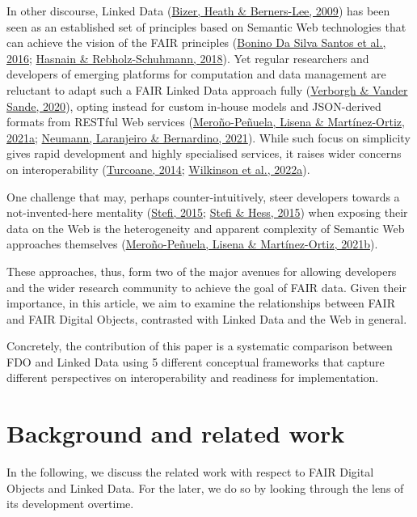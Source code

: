 In other discourse, Linked Data (\protect\hyperlink{ref-19s3yyxDn}{Bizer, Heath \& Berners-Lee, 2009}) has been seen as an established set of principles based on Semantic Web technologies that can achieve the vision of the FAIR principles (\protect\hyperlink{ref-EJDjHrUv}{Bonino Da Silva Santos et al., 2016}; \protect\hyperlink{ref-GJHYN6xW}{Hasnain \& Rebholz-Schuhmann, 2018}). Yet regular researchers and developers of emerging platforms for computation and data management are reluctant to adapt such a FAIR Linked Data approach fully (\protect\hyperlink{ref-jHwttlTs}{Verborgh \& Vander Sande, 2020}), opting instead for custom in-house models and JSON-derived formats from RESTful Web services (\protect\hyperlink{ref-99MS5xE0}{Meroño-Peñuela, Lisena \& Martínez-Ortiz, 2021a}; \protect\hyperlink{ref-J2H8yssV}{Neumann, Laranjeiro \& Bernardino, 2021}). While such focus on simplicity gives rapid development and highly specialised services, it raises wider concerns on interoperability (\protect\hyperlink{ref-DNTCUjpC}{Turcoane, 2014}; \protect\hyperlink{ref-Pa67pUtR}{Wilkinson et al., 2022a}).

One challenge that may, perhaps counter-intuitively, steer developers towards a not-invented-here mentality (\protect\hyperlink{ref-uxWjmlio}{Stefi, 2015}; \protect\hyperlink{ref-v0WwFHgT}{Stefi \& Hess, 2015}) when exposing their data on the Web is the heterogeneity and apparent complexity of Semantic Web approaches themselves (\protect\hyperlink{ref-5V3GqSzR}{Meroño-Peñuela, Lisena \& Martínez-Ortiz, 2021b}).

These approaches, thus, form two of the major avenues for allowing developers and the wider research community to achieve the goal of FAIR data. Given their importance, in this article, we aim to examine the relationships between FAIR and FAIR Digital Objects, contrasted with Linked Data and the Web in general.

Concretely, the contribution of this paper is a systematic comparison between FDO and Linked Data using 5 different conceptual frameworks that capture different perspectives on interoperability and readiness for implementation.

\hypertarget{sec:background}{%
\section{Background and related work}\label{sec:background}}

In the following, we discuss the related work with respect to FAIR Digital Objects and Linked Data. For the later, we do so by looking through the lens of its development overtime.

